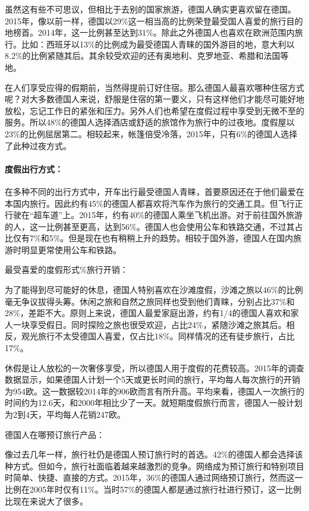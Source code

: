 虽然这有些不可思议，但相比于去别的国家旅游，德国人确实更喜欢留在德国。2015年，像以前一样，德国以29\%这一相当高的比例荣登最受国人喜爱的旅行目的地榜首。2014年，这一比例甚至达到31\%。除此之外德国人也喜欢在欧洲范围内旅行。比如：西班牙以13\%的比例成为最受德国人青睐的国外游目的地，意大利以8.2\%的比例紧随其后。其余较受欢迎的还有奥地利、克罗地亚、希腊和法国等地。

在人们享受应得的假期前，当然得提前订好住宿。那么德国人最喜欢哪种住宿方式呢？对大多数德国人来说，舒服是住宿的第一要义，只有这样他们才能尽可能好地放松，忘记工作日的紧张和压力。另外人们也希望在度假过程中享受到无微不至的服务。所以48\%的德国人选择酒店或舒适的旅馆作为旅行中的过夜地。度假屋以23\%的比例屈居第二。相较起来，帐篷倍受冷落，2015年，只有6\%的德国人选择了此种过夜方式。



\paragraph{度假出行方式：}

在多种不同的出行方式中，开车出行最受德国人青睐，首要原因还在于他们最爱在本国内旅行。因此约有45\%的德国人都喜欢将汽车作为旅行的交通工具。但飞行正行驶在“超车道”上。2015年，约有40\%的德国人乘坐飞机出游。对于前往国外旅游的人，这一比例甚至更高，达到56\%。德国人也会使用公车和铁路交通，不过其占比仅有7\%和5\%。但是现在也有稍稍上升的趋势。相较于国外游，德国人在国内旅游时明显更常使用公车和铁路。



最受喜爱的度假形式\%旅行开销：

为了能得到尽可能好的休息，德国人特别喜欢在沙滩度假，沙滩之旅以46\%的比例毫无争议拔得头筹。休闲之旅和自然之旅同样也受到他们青睐，分别占比37\%和28\%，差距不大。原则上来说，德国人最爱家庭出游，约有1/4的德国人喜欢和家人一块享受假日。同时探险之旅也很受欢迎，占比24\%，紧随沙滩之旅其后。相反，观光旅行不太受德国人喜爱，仅占比18\%。同样情况的还有徒步旅行，占比17\%。

休假是让人放松的一次奢侈享受，所以德国人用于度假的花费较高。2015年的调查数据显示，如果德国人计划一个5天或更长时间的旅行，平均每人每次旅行的开销为954欧。这一数据较2014年的906欧而言有所升高。平均来看，德国人一次旅行的时间约为12.6天，和2000年相比少了一天。就短期度假旅行而言，德国人一般计划为2到4天，平均每人花销247欧。



德国人在哪预订旅行产品：

像过去几年一样，旅行社仍是德国人预订旅行时的首选。42\%的德国人都会选择该种方式。但如今，旅行社面临着越来越激烈的竞争。网络成为预订旅行和特别项目时简单、快捷、直接的方式。2015年，36\%的德国人通过网络预订旅行，然而这一比例在2005年时仅有11\%。当时57\%的德国人都是通过旅行社进行预订，这一比例比现在来说大了很多。